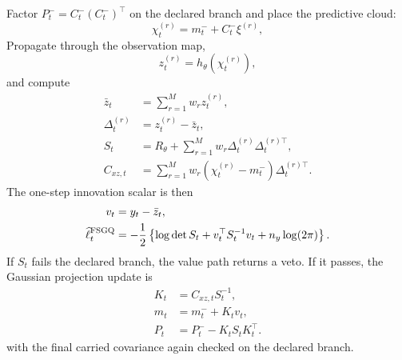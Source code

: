 Factor \(P_t^-=C_t^-(C_t^-)^\top\) on the declared branch and place the
predictive cloud:
\begin{equation}
  \chi_t^{(r)} = m_t^-+C_t^-\xi^{(r)},
  \label{eq:bf-hd-sgqf-obs-placed-points}
\end{equation}
Propagate through the observation map,
\begin{equation}
  z_t^{(r)}=h_\theta(\chi_t^{(r)}),
  \label{eq:bf-hd-sgqf-obs-values}
\end{equation}
and compute
\begin{align}
  \bar z_t&=\sum_{r=1}^Mw_rz_t^{(r)},
  \label{eq:bf-hd-sgqf-obs-mean}\\
  \Delta_t^{(r)}&=z_t^{(r)}-\bar z_t,
  \label{eq:bf-hd-sgqf-obs-centered}\\
  S_t&=R_\theta+\sum_{r=1}^Mw_r
  \Delta_t^{(r)}\Delta_t^{(r)\top},
  \label{eq:bf-hd-sgqf-obs-cov}\\
  C_{xz,t}&=\sum_{r=1}^Mw_r
  (\chi_t^{(r)}-m_t^-)\Delta_t^{(r)\top}.
  \label{eq:bf-hd-sgqf-cross-cov}
\end{align}
The one-step innovation scalar is then
\begin{align}
  v_t&=y_t-\bar z_t,
  \label{eq:bf-hd-sgqf-innovation}\\
  \widehat\ell_t^{\rm FSGQ}
  &=-\frac12
  \left\{\log\det S_t+v_t^\top S_t^{-1}v_t+n_y\log(2\pi)\right\}.
  \label{eq:bf-hd-sgqf-loglik}
\end{align}
If \(S_t\) fails the declared branch, the value path returns a veto.  If it
passes, the Gaussian projection update is
\begin{align}
  K_t&=C_{xz,t}S_t^{-1},
  \label{eq:bf-hd-sgqf-kalman-gain}\\
  m_t&=m_t^-+K_tv_t,
  \label{eq:bf-hd-sgqf-filter-mean}\\
  P_t&=P_t^- - K_tS_tK_t^\top.
  \label{eq:bf-hd-sgqf-filter-cov}
\end{align}
with the final carried covariance again checked on the declared branch.

